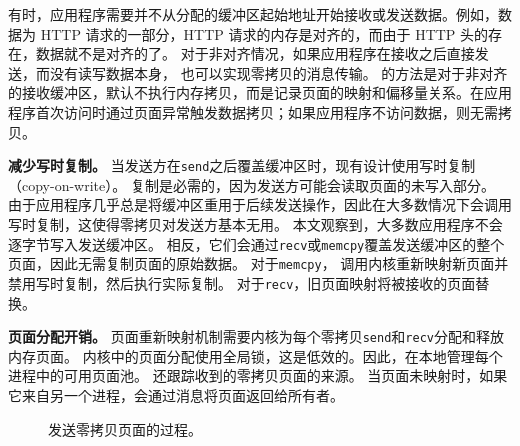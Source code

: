 有时，应用程序需要并不从分配的缓冲区起始地址开始接收或发送数据。例如，数据为 HTTP 请求的一部分，HTTP 请求的内存是对齐的，而由于 HTTP 头的存在，数据就不是对齐的了。
对于非对齐情况，如果应用程序在接收之后直接发送，而没有读写数据本身，\sys{} 也可以实现零拷贝的消息传输。\sys{} 的方法是对于非对齐的接收缓冲区，默认不执行内存拷贝，而是记录页面的映射和偏移量关系。在应用程序首次访问时通过页面异常触发数据拷贝；如果应用程序不访问数据，则无需拷贝。



\textbf{减少写时复制。}
当发送方在\texttt {send}之后覆盖缓冲区时，现有设计使用写时复制（copy-on-write）。
复制是必需的，因为发送方可能会读取页面的未写入部分。
由于应用程序几乎总是将缓冲区重用于后续发送操作，因此在大多数情况下会调用写时复制，这使得零拷贝对发送方基本无用。
本文观察到，大多数应用程序不会逐字节写入发送缓冲区。 相反，它们会通过\texttt {recv}或\texttt {memcpy}覆盖发送缓冲区的整个页面，因此无需复制页面的原始数据。
对于\texttt {memcpy}，\libipc{} 调用内核重新映射新页面并禁用写时复制，然后执行实际复制。
对于\texttt {recv}，旧页面映射将被接收的页面替换。


\textbf {页面分配开销。}
页面重新映射机制需要内核为每个零拷贝\texttt {send}和\texttt {recv}分配和释放内存页面。
内核中的页面分配使用全局锁，这是低效的。因此，\libipc {}在本地管理每个进程中的可用页面池。
\libipc {}还跟踪收到的零拷贝页面的来源。
当页面未映射时，如果它来自另一个进程，\libipc {}会通过消息将页面返回给所有者。


\begin{figure}[htbp]
	\centering
	\hspace{0.02\textwidth}
	\caption{发送零拷贝页面的过程。}
\end{figure}


